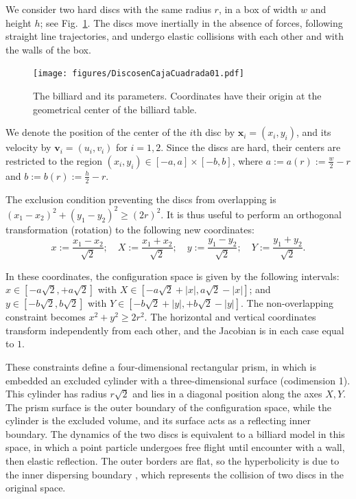 \documentclass[superscriptaddress,pre,reprint,showpacs,onecolumn]{revtex4-1}
\newcommand{\defeq}{:=}
\begin{document}
We consider two hard discs with the same radius $r$,
in a box of width $w$ and height $h$; see Fig.~\ref{billar01}. 
The discs move inertially in the absence of forces, 
following straight line trajectories,
and undergo elastic collisions with each 
other and with the walls of the box.

\begin{figure}[h]
  \begin{center}
  \texttt{[image: figures/DiscosenCajaCuadrada01.pdf]}
  \end{center}
  \caption{The billiard and its parameters. Coordinates
    have their origin at the geometrical center of the 
    billiard table.}\label{billar01}
\end{figure}


We denote the position of the center of the $i$th disc by 
$\mathbf{x}_i = (x_i, y_i)$, and its velocity by $\mathbf{v}_i = (u_i, v_i)$ for $i=1,2$. Since the discs are hard, 
their centers are restricted to the region 
$(x_i, y_i) \in [-a,a] \times [-b, b]$, where 
$a \defeq a(r) \defeq \frac{w}{2} - r $ and
$b \defeq b(r) \defeq \frac{h}{2} - r $.

The exclusion condition preventing the discs from overlapping is $(x_1-x_2)^2 + (y_1-y_2)^2 \ge (2r)^2$.
It is thus useful to perform an orthogonal transformation (rotation) to the following new coordinates:
\begin{equation}\label{cambiocoor01}
 x \defeq \frac{x_1 - x_2}{\sqrt{2}}; 
\quad X \defeq \frac{x_1 + x_2}{\sqrt{2}}; 
\quad y \defeq \frac{y_1 - y_2}{\sqrt{2}}; 
\quad Y \defeq \frac{y_1 + y_2}{\sqrt{2}}.
\end{equation}

In these coordinates, the configuration space is given by the following
intervals:
$x \in [-a \sqrt{2}, +a \sqrt{2}]$ with 
$X \in [-a \sqrt{2} + |x|, a \sqrt{2} - |x|]$; and 
 $y \in [-b \sqrt{2}, b \sqrt{2}]$ with $Y \in [-b \sqrt{2} + |y|, +b \sqrt{2} - |y|]$.
The non-overlapping constraint becomes $x^2 + y^2 \ge 2 r^2$.
The horizontal and vertical coordinates transform independently
from each other, and the Jacobian is in each case equal to $1$.

These constraints define a four-dimensional
rectangular prism, in which is embedded an excluded cylinder with a three-dimensional surface
(codimension 1).
This cylinder has radius $r\sqrt{2}$ and lies
in  a diagonal position along the axes $X, Y$.
The prism surface is the outer boundary of the configuration space,
while the cylinder is the excluded volume, and its surface
acts as a reflecting inner boundary.
The dynamics of the two discs is equivalent to a billiard model in this space, in which 
a point particle undergoes free flight until
encounter with a wall, then elastic reflection.
The outer borders are flat, so the
hyperbolicity is due to the inner dispersing
boundary \cite{Sim99}, which represents the collision of
two discs in the original space.
\end{document}
